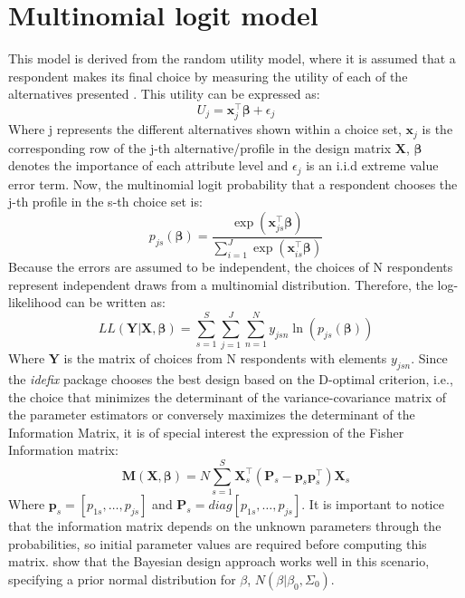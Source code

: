\documentclass[12pt,a4paper,oneside]{article}
\begin{document}
\section{Multinomial logit model}
This model is derived from the random utility model, where it is assumed that a respondent makes its final choice by measuring the utility of each of the alternatives presented \citep[see][chap. 3]{Train2009}. This utility can be expressed as:
\begin{equation}
	U_j = \mathbf{x}^\top_j \pmb{\beta} + \epsilon_j
\end{equation}
Where j represents the different alternatives shown within a choice set, $\mathbf{x}_j$ is the corresponding row of the j-th alternative/profile in the design matrix $\mathbf{X}$, $\pmb{\beta}$ denotes the importance of each attribute level and $\epsilon_j$ is an i.i.d extreme value error term. Now, the multinomial logit probability that a respondent chooses the j-th profile in the s-th choice set is:
\begin{equation}
	p_{js}(\pmb{\beta}) = \frac{\exp(\mathbf{x}^\top_{js}\pmb{\beta})}{\sum^{J}_{i=1}\exp(\mathbf{x}^\top_{is}\pmb{\beta})}
\end{equation}
Because the errors are assumed to be independent, the choices of N respondents re\-present independent draws from a multinomial distribution. Therefore, the log-likelihood can be written as:
\begin{equation}
    LL(\mathbf{Y}|\mathbf{X},\pmb{\beta}) = \sum^{S}_{s=1} \sum^{J}_{j=1} \sum^{N}_{n=1} y_{jsn} \ln(p_{js}(\pmb{\beta}))
\end{equation}
Where $\mathbf{Y}$ is the matrix of choices from N respondents with elements $y_{jsn}$.
Since the \textit{idefix} package chooses the best design based on the D-optimal criterion, i.e., the choice that minimizes the determinant of the variance-covariance matrix of the parameter estimators or conversely maximizes the determinant of the Information Matrix, it is of special interest the expression of the Fisher Information matrix:
\begin{equation}
\mathbf{M}(\mathbf{X},\pmb{\beta}) = N \sum^{S}_{s=1} \mathbf{X}^\top_s(\mathbf{P}_s-\mathbf{p}_s \mathbf{p}_s^\top) \mathbf{X}_s
\end{equation}
Where $\mathbf{p}_s = [p_{1s}, … ,p_{js}]$ and $\mathbf{P}_s=diag[p_{1s}, … ,p_{js}]$.
It is important to notice that the information matrix depends on the unknown parameters through the probabilities, so initial parameter values are required before computing this matrix. \citet{Kessels2006} show that the Bayesian design approach works well in this scenario, specifying a prior normal distribution for $\beta$, $N(\beta|\beta_0,\Sigma_0)$.\\
\end{document}
